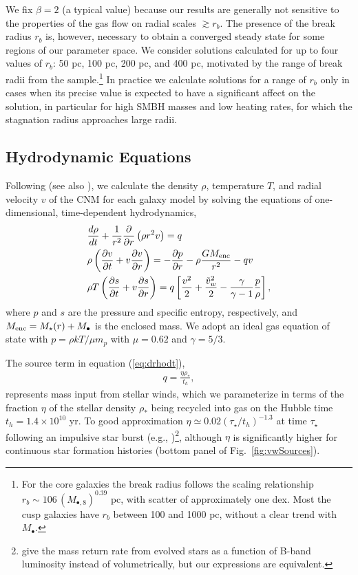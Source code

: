 \documentclass[usenatbib,fleqn]{mn2e}
\newcommand{\rb}{r_b}
\newcommand{\dxdy}[2]{\frac{d #1}{d #2} }
\newcommand{\drhodt}{\dxdy{\rho}{t}}
\newcommand{\ke}{\frac{v^2}{2}}
\newcommand{\kew}{\frac{\tilde{v}_{w}^2}{2}}
\newcommand{\gammaf}{\frac{\gamma}{\gamma-1}}
\newcommand{\cs}{\frac{p}{\rho}}
\newcommand{\rhostar}{\rho_*}
\newcommand{\Mbh}[1][]{M_{\bullet#1}}
\newcommand{\Mbheight}{M_{\bullet,8}}
\renewcommand{\th}{t_h}
\begin{document}
We fix $\beta = 2$ (a typical value) because our results are generally
not sensitive to the properties of the gas flow on radial scales
$\gtrsim r_b$. The presence of the break radius $r_{b}$ is, however,
necessary to obtain a converged steady state for some regions of our
parameter space.  We consider solutions calculated for up to four
values of $\rb$: 50 pc, 100 pc, 200 pc, and 400 pc, motivated by the
range of break radii from the \citet{LauerFaber+:2007a}
sample.\footnote{For the core galaxies the break radius follows the
  scaling relationship $\rb\sim 106 \, (\Mbheight)^{0.39}$ pc, with
  scatter of approximately one dex.  Most the cusp galaxies have $\rb$
  between 100 and 1000 pc, without a clear trend with $\Mbh$.}  In
practice we calculate solutions for a range of $\rb$ only in cases
when its precise value is expected to have a significant affect on the
solution, in particular for high SMBH masses and low heating rates,
for which the stagnation radius approaches large radii.


\subsection{Hydrodynamic Equations}
\label{sec:hydro}

Following \citet{Quataert:2004a} (see also \citealt{HolzerAxford:1970a,De-ColleGuillochon+:2012a,ShcherbakovWong+:2014a}), we calculate the density $\rho$, temperature $T$, and radial velocity $v$ of the CNM for each galaxy model by solving the equations of one-dimensional, time-dependent hydrodynamics,
\begin{align}
  &\drhodt+\frac{1}{r^2}\frac{\partial}{\partial r}\left(\rho r^2 v\right)=q \label{eq:drhodt}\\
  &\rho \left(\frac{\partial v}{\partial t} + v\frac{\partial
      v}{\partial r}\right) =-\frac{\partial p}{\partial r}- \rho\frac{GM_{\rm enc}}{r^{2}} -q v \label{eq:dvdt}\\
  &\rho T\left(\frac{\partial s}{\partial t} + v\frac{\partial
      s}{\partial r}\right)=q\left[\ke+\kew-\gammaf \cs \right] 
, 
\label{eq:dsdt}
\end{align}
where $p$ and $s$ are the pressure and specific entropy, respectively, and $M_{\rm enc} = M_{\star}(r) + \Mbh$ is the
enclosed mass.  We adopt an ideal gas equation of state with $p = \rho kT/\mu m_p$ with $\mu = 0.62$  and $\gamma = 5/3$. 

The source term in equation (\ref{eq:drhodt}),
\begin{align}
  q=\frac{\eta \rhostar}{\th},
\label{eq:q}
\end{align}
represents mass input from stellar winds, which we parameterize in
terms of the fraction $\eta$ of the stellar density $\rhostar$ being
recycled into gas on the Hubble time $\th = 1.4 \times 10^{10}$ yr.
To good approximation $\eta\simeq 0.02 (\tau_{\star}/t_h)^{-1.3}$ at
time $\tau_{\star}$ following an impulsive star burst (e.g.,
\citealt{Ciotti+91})\footnote{\citet{Ciotti+91} give the mass return
  rate from evolved stars as a function of B-band luminosity instead
  of volumetrically, but our expressions are equivalent.}, although
$\eta$ is significantly higher for continuous star formation histories
(bottom panel of Fig.~\ref{fig:vwSources}).
\end{document}
